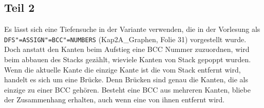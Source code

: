 \documentclass[parskip=half,a4paper]{scrartcl}
\begin{document}
\subsection*{Teil 2}

Es lässt sich eine Tiefensuche in der Variante verwenden, die in der Vorlesung als \texttt{DFS"=ASSIGN"=BCC"=NUMBERS} (Kap2A\_Graphen, Folie 31) vorgestellt wurde. Doch anstatt den Kanten beim Aufstieg eine BCC Nummer zuzuordnen, wird beim abbauen des Stacks gezählt, wieviele Kanten von Stack gepoppt wurden. Wenn die aktuelle Kante die einzige Kante ist die vom Stack entfernt wird, handelt es sich um eine Brücke. Denn Brücken sind genau die Kanten, die als einzige zu einer BCC gehören. Besteht eine BCC aus mehreren Kanten, bliebe der Zusammenhang erhalten, auch wenn eine von ihnen entfernt wird.
\end{document}

